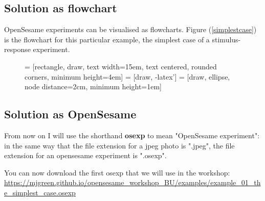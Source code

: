 \documentclass[a4paper]{tufte-handout}
\begin{document}
\subsection{Solution as flowchart}
OpenSesame experiments can be visualised as flowcharts. Figure (\ref{simplestcase}) is the flowchart for this particular example, the simplest case of a stimulus-response experiment.
\begin{figure}[!htbp]
\centering
{} = [rectangle, draw, text width=15em, text centered, rounded corners, minimum height=4em]
 = [draw, -latex']
 = [draw, ellipse, node distance=2cm, minimum height=1em]
\end{figure}

\FloatBarrier
\subsection{Solution as OpenSesame}
From now on I will use the shorthand \textbf{osexp} to mean "OpenSesame experiment": in the same way that the file extension for a jpeg photo is ".jpeg", the file extension for an opensesame experiment is ".osexp".

You can now download the first osexp that we will use in the workshop: \url{https://mjgreen.github.io/opensesame_workshop_BU/examples/example_01_the_simplest_case.osexp}
\end{document}
